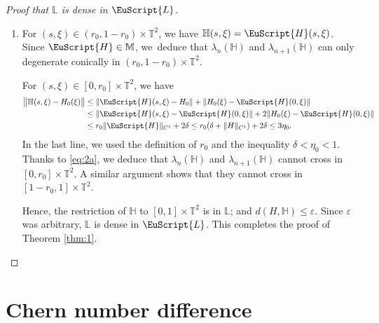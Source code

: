 \documentclass[10pt]{amsart}
\let\pazocal\EuScript
\theoremstyle{definition}
\newcommand{\LL}{{\pazocal{L}}}
\newcommand{\HH}{\pazocal{H}}
\newcommand{\Hh}{{\mathbb{H}}}
\newcommand{\Ll}{\mathbb{L}}
\newcommand{\Mm}{\mathbb{M}}
\newcommand{\Tt}{{\mathbb{T}}}
\let\epsi\varepsilon
\begin{document}
\begin{proof}[Proof that $\Ll$ is dense in $\LL$]
\begin{enumerate}
\item
For $(s,\xi) \in (r_0,1-r_0) \times \Tt^2$, we have $\Hh(s,\xi) = \HH(s,\xi)$. Since $\HH \in \Mm$, we~deduce that $\lambda_n(\Hh)$ and $\lambda_{n+1}(\Hh)$ can only degenerate conically in $(r_0,1-r_0) \times \Tt^2$.

For $(s,\xi) \in [0,r_0] \times \Tt^2$, we have
\[
\begin{split}
\big\| \Hh(s,\xi) - H_0(\xi) \big\| &\leq \| \HH(s,\xi)-H_0 \| + \| H_0(\xi) -\HH(0,\xi) \|
\\
&\leq \| \HH(s,\xi)-\HH(0,\xi) \| + 2\| H_0(\xi) -\HH(0,\xi) \|
\\
&\leq r_0 \| \HH \|_{C^1} + 2 \delta \leq r_0 (\delta + \|H\|_{C^1}) + 2 \delta \leq 3\eta_0.
\end{split}
\]
In the last line, we used the definition of $r_0$ and the inequality $\delta < \eta_0 < 1$. Thanks to \eqref{eq:2a}, we deduce that $\lambda_n(\Hh)$ and $\lambda_{n+1}(\Hh)$ cannot cross in $[0,r_0] \times \Tt^2$. A similar argument shows that they cannot cross in $[1-r_0,1] \times \Tt^2$.

Hence, the restriction of $\Hh$ to $[0,1] \times \Tt^2$ is in $\Ll$; and $d(H,\Hh) \leq \epsi$. Since $\epsi$ was arbitrary, $\Ll$ is dense in $\LL$. This completes the proof of Theorem \ref{thm:1}.\qedhere
\end{enumerate}
\end{proof}

\section{Chern number difference}\label{sec:5}
\end{document}
